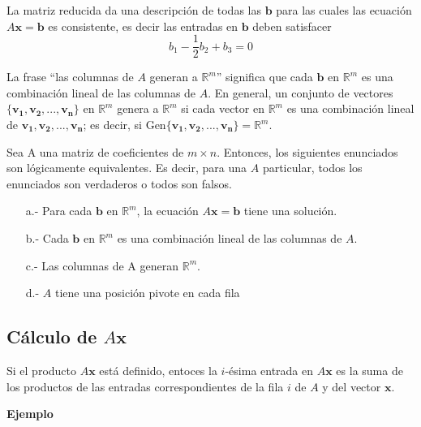 \documentclass{article}
\begin{document}
La matriz reducida da una descripción de todas las $\mathbf{b}$ para las cuales las ecuación $A\mathbf{x} = \mathbf{b}$ es consistente, es decir las entradas en $\mathbf{b}$ deben satisfacer $$b_1 - \frac{1}{2}b_2 + b_3 = 0$$

La frase “las columnas de $A$ generan a $\mathbb{R}^m$” significa que cada $\mathbf{b}$ en $\mathbb{R}^m$ es una combinación lineal de las columnas de $A$. En general, un conjunto de vectores $\{\mathbf{v_1}, \mathbf{v_2},..., \mathbf{v_n}\}$ en $\mathbb{R}^m$ genera a $\mathbb{R}^m$ si cada vector en $\mathbb{R}^m$ es una combinación lineal de $\mathbf{v_1}, \mathbf{v_2},..., \mathbf{v_n}$; es decir, si Gen$\{\mathbf{v_1}, \mathbf{v_2},..., \mathbf{v_n}\} = \mathbb{R}^m$.

\begin{tcolorbox}[colback=red!10!white, colframe=red!70!black, title=Las columnas de $A$ generan $\mathbb{R}^m$]
    Sea A una matriz de coeficientes de $m \times n$. Entonces, los siguientes enunciados son lógicamente equivalentes. Es decir, para una $A$ particular, todos los enunciados son verdaderos o todos son falsos.
    \begin{itemize}
        \item[a.-] Para cada $\mathbf{b}$ en $\mathbb{R}^m$, la ecuación $A\mathbf{x} = \mathbf{b}$ tiene una solución.
        \item[b.-] Cada $\mathbf{b}$ en $\mathbb{R}^m$ es una combinación lineal de las columnas de $A$.
        \item[c.-] Las columnas de A generan $\mathbb{R}^m$. 
        \item[d.-] $A$ tiene una posición pivote en cada fila 
    \end{itemize}
\end{tcolorbox}

\subsection*{Cálculo de $A\mathbf{x}$}

\begin{tcolorbox}[colback=green!20!white,colframe=green!80!black,title=Regla Fila-Vector para calcular $A\mathbf{x}$]
    Si el producto $A\mathbf{x}$ está definido, entoces la $i$-ésima entrada en $A\mathbf{x}$ es la suma de los productos de las entradas correspondientes de la fila $i$ de $A$ y del vector $\mathbf{x}$.
\end{tcolorbox}

\begin{large}
    \textbf{Ejemplo}
\end{large}
\end{document}
